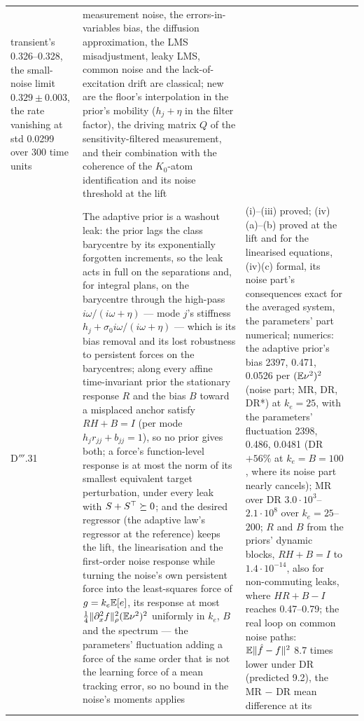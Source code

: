 {\begin{longtable}{@{}>{\raggedright\arraybackslash}p{}>{\raggedright\arraybackslash}p{}%
>{\raggedright\arraybackslash}p{}>{\raggedright\arraybackslash}p{}@{}}
transient's 0.326--0.328, the small-noise limit $0.329\pm0.003$, the rate vanishing at std 0.0299 over 300 time units
& measurement noise, the errors-in-variables bias, the diffusion approximation, the LMS misadjustment, leaky LMS,
common noise and the lack-of-excitation drift are classical; new are the floor's interpolation in the prior's
mobility ($h_j + \eta$ in the filter factor), the driving matrix $Q$ of the sensitivity-filtered measurement, and
their combination with the coherence of the $K_0$-atom identification and its noise threshold at the lift\\
\addlinespace[0.5pt]
D$'''$.31 & The adaptive prior is a washout leak: the prior lags the class barycentre by its exponentially forgotten
increments, so the leak acts in full on the separations and, for integral plans, on the barycentre through the
high-pass $i\omega/(i\omega + \eta)$ --- mode $j$'s stiffness $h_j + \sigma_0i\omega/(i\omega + \eta)$ --- which is
its bias removal and its lost robustness to persistent forces on the barycentres; along every affine time-invariant
prior the stationary response $R$ and the bias $B$ toward a misplaced anchor satisfy $RH + B = I$ (per mode
$h_jr_{jj} + b_{jj} = 1$), so no prior gives both; a force's function-level response is at most the norm of its
smallest equivalent target perturbation, under every leak with $S + S^\top\succeq0$; and the desired regressor (the
adaptive law's regressor at the reference) keeps the lift, the linearisation and the first-order noise response while
turning the noise's own persistent force into the least-squares force of $g = k_e\mathbb{E}[e]$, its response at most
$\frac14\lVert \partial^2_xf\rVert^2_\rho(\mathbb{E}\nu^2)^2$ uniformly in $k_e$, $B$ and the spectrum --- the parameters'
fluctuation adding a force of the same order that is not the learning force of a mean tracking error, so no bound in
the noise's moments applies
& (i)--(iii) proved; (iv)(a)--(b) proved at the lift and for the linearised equations, (iv)(c) formal, its noise
part's consequences exact for the averaged system, the parameters' part numerical; numerics: the adaptive prior's bias
2397, 0.471, 0.0526 per $(\mathbb{E}\nu^2)^2$ (noise part; MR, DR, DR*) at $k_e = 25$, with the parameters' fluctuation 2398,
0.486, 0.0481 (DR $+56\%$ at $k_e = B = 100$, where its noise part nearly cancels); MR over DR
$3.0\cdot10^3$--$2.1\cdot10^8$ over $k_e = 25$--$200$; $R$ and $B$ from the priors' dynamic blocks, $RH + B = I$ to
$1.4\cdot10^{-14}$, also for non-commuting leaks, where $HR + B - I$ reaches 0.47--0.79; the real loop on common noise
paths: $\mathbb{E}\lVert \hat f - f\rVert^2$ 8.7 times lower under DR (predicted 9.2), the MR $-$ DR mean difference at its

\end{longtable}}
